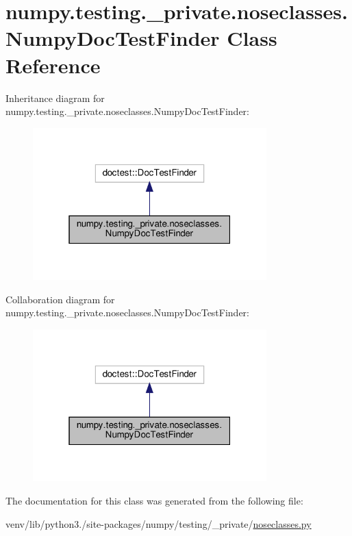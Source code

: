 \hypertarget{classnumpy_1_1testing_1_1__private_1_1noseclasses_1_1NumpyDocTestFinder}{}\section{numpy.\+testing.\+\_\+private.\+noseclasses.\+Numpy\+Doc\+Test\+Finder Class Reference}
\label{classnumpy_1_1testing_1_1__private_1_1noseclasses_1_1NumpyDocTestFinder}


Inheritance diagram for numpy.\+testing.\+\_\+private.\+noseclasses.\+Numpy\+Doc\+Test\+Finder\+:
\nopagebreak
\begin{figure}[H]
\begin{center}
\leavevmode
\includegraphics[width=256pt]{classnumpy_1_1testing_1_1__private_1_1noseclasses_1_1NumpyDocTestFinder__inherit__graph}
\end{center}
\end{figure}


Collaboration diagram for numpy.\+testing.\+\_\+private.\+noseclasses.\+Numpy\+Doc\+Test\+Finder\+:
\nopagebreak
\begin{figure}[H]
\begin{center}
\leavevmode
\includegraphics[width=256pt]{classnumpy_1_1testing_1_1__private_1_1noseclasses_1_1NumpyDocTestFinder__coll__graph}
\end{center}
\end{figure}


The documentation for this class was generated from the following file\+:\begin{DoxyCompactItemize}
\item 
venv/lib/python3./site-\/packages/numpy/testing/\+\_\+private/\hyperlink{noseclasses_8py}{noseclasses.\+py}\end{DoxyCompactItemize}
